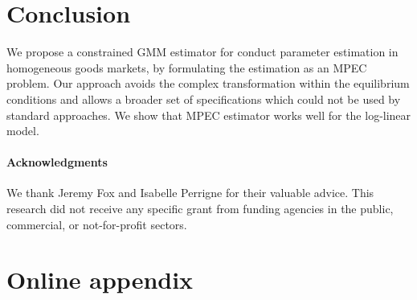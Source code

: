 \documentclass[11pt, a4paper]{article}
\begin{document}
\section{Conclusion}
We propose a constrained GMM estimator for conduct parameter estimation in homogeneous goods markets, by formulating the estimation as an MPEC problem. 
Our approach avoids the complex transformation within the equilibrium conditions and allows a broader set of specifications which could not be used by standard approaches. 
We show that MPEC estimator works well for the log-linear model. 


\paragraph{Acknowledgments}
We thank Jeremy Fox and Isabelle Perrigne for their valuable advice. This research did not receive any specific grant from funding agencies in the public, commercial, or not-for-profit sectors. 

\newpage



\newpage
\appendix

\section{Online appendix}\label{sec:appendix}
\end{document}
